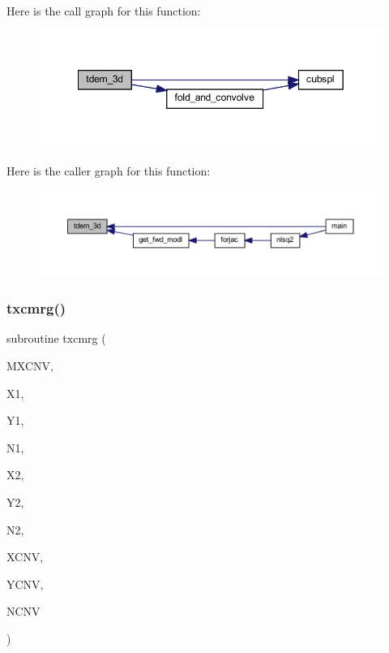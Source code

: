 Here is the call graph for this function\+:\nopagebreak
\begin{figure}[H]
\begin{center}
\leavevmode
\includegraphics[width=349pt]{Leroi_8f90_a9459812f7e65c931ea1310423669f22a_cgraph}
\end{center}
\end{figure}
Here is the caller graph for this function\+:\nopagebreak
\begin{figure}[H]
\begin{center}
\leavevmode
\includegraphics[width=350pt]{Leroi_8f90_a9459812f7e65c931ea1310423669f22a_icgraph}
\end{center}
\end{figure}
\mbox{\label{Leroi_8f90_a91b093a6d74ab88b54c4e2121d31ffa2}} 
\subsubsection{\texorpdfstring{txcmrg()}{txcmrg()}}
{\footnotesize\ttfamily subroutine txcmrg (\begin{DoxyParamCaption}\item[{integer, intent(in)}]{M\+X\+C\+NV,  }\item[{real, dimension(mxcnv), intent(in)}]{X1,  }\item[{real, dimension(mxcnv), intent(in)}]{Y1,  }\item[{integer, intent(in)}]{N1,  }\item[{real, dimension(mxcnv), intent(in)}]{X2,  }\item[{real, dimension(mxcnv), intent(in)}]{Y2,  }\item[{integer, intent(in)}]{N2,  }\item[{real, dimension(mxcnv), intent(out)}]{X\+C\+NV,  }\item[{real, dimension(4,mxcnv), intent(out)}]{Y\+C\+NV,  }\item[{integer, intent(out)}]{N\+C\+NV }\end{DoxyParamCaption})}

